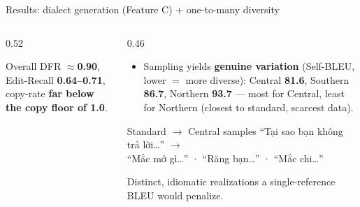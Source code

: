 \documentclass[aspectratio=169,11pt]{beamer}
\newcommand{\hl}[1]{\textcolor{oiblue}{\textbf{#1}}}
\begin{document}
\begin{frame}{Results: dialect generation (Feature C) + one-to-many diversity}
  \begin{columns}[T]
    \begin{column}{0.52\textwidth}
      \centering
      \par\scriptsize Overall DFR \hl{$\approx$0.90}, Edit-Recall \hl{0.64--0.71}, copy-rate \hl{far below the copy floor of 1.0}.
    \end{column}
    \begin{column}{0.46\textwidth}
      \begin{itemize}\small
        \item Sampling yields \hl{genuine variation} (Self-BLEU, lower $=$ more diverse): Central \hl{81.6}, Southern \hl{86.7}, Northern \hl{93.7} --- most for Central, least for Northern (closest to standard, scarcest data).
      \end{itemize}
      \footnotesize
      \begin{block}{\footnotesize Standard $\to$ Central samples}
        ``Tại sao bạn không trả lời\dots'' $\to$\\
        ``Mắc mớ gì\dots'' · ``Răng bạn\dots'' · ``Mắc chi\dots''
      \end{block}
      \par\scriptsize Distinct, idiomatic realizations a single-reference BLEU would penalize.
    \end{column}
  \end{columns}
\end{frame}
\end{document}
